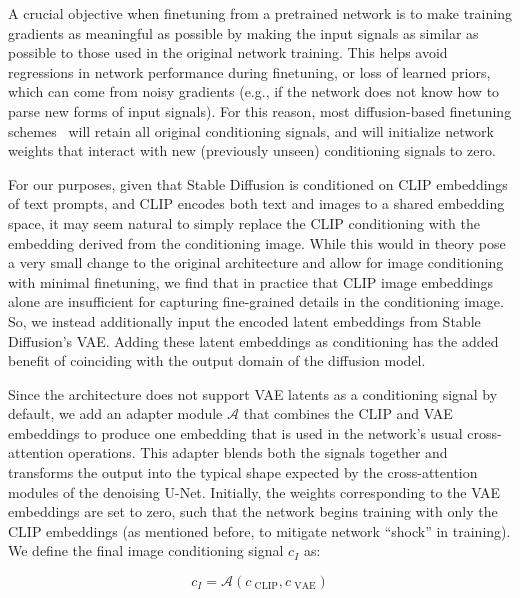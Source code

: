         A crucial objective when finetuning from a pretrained network is to make training gradients as meaningful as possible by making the input signals as similar as possible to those used in the original network training. This helps avoid regressions in network performance during finetuning, or loss of learned priors, which can come from noisy gradients (e.g., if the network does not know how to parse new forms of input signals). For this reason, most diffusion-based finetuning schemes~\cite{instruct_pix2pix,zhang2023adding} will retain all original conditioning signals, and will initialize network weights that interact with new (previously unseen) conditioning signals to zero.  
        
        For our purposes, given that Stable Diffusion is conditioned on CLIP embeddings of text prompts, and CLIP encodes both text and images to a shared embedding space, it may seem natural to simply replace the CLIP conditioning with the embedding derived from the conditioning image. While this would in theory pose a very small change to the original architecture and allow for image conditioning with minimal finetuning, we find that in practice that CLIP image embeddings alone are insufficient for capturing fine-grained details in the conditioning image. So, we instead additionally input the encoded latent embeddings from Stable Diffusion's VAE. Adding these latent embeddings as conditioning has the added benefit of coinciding with the output domain of the diffusion model.

        Since the architecture does not support VAE latents as a conditioning signal by default, we add an adapter module $\mathcal{A}$ that combines the CLIP and VAE embeddings to produce one embedding that is used in the network's usual cross-attention operations. This adapter blends both the signals together and transforms the output into the typical shape expected by the cross-attention modules of the denoising U-Net. Initially, the weights corresponding to the VAE embeddings are set to zero, such that the network begins training with only the CLIP embeddings (as mentioned before, to mitigate network ``shock'' in training). We define the final image conditioning signal $c_I$ as:

            \begin{equation}
                c_I = \mathcal{A}(c_{\text{ CLIP}}, c_{\text{ VAE}})
            \end{equation}

        \def\Plus{\texttt{+}}
